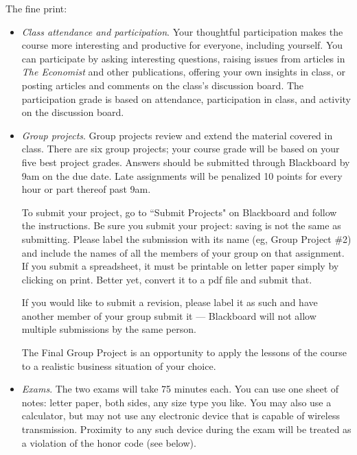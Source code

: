 \documentclass[letterpaper,12pt]{article}
\begin{document}
The fine print:
\begin{itemize}

\item \textit{Class attendance and participation}. Your thoughtful
participation makes the course more interesting and productive for everyone, 
including yourself.  
You can participate by asking interesting questions, 
raising issues from articles in {\it The Economist\/} and 
other publications, 
offering your own insights in class, 
or posting articles and comments on the class's 
discussion board. 
The participation grade is based on attendance, 
participation in class, and activity on the discussion board.  

\item \textit{Group projects}. 
Group projects review and extend the material covered in class.   
There are six group projects; your course grade will be based 
on your five best project grades.  
Answers should be submitted through Blackboard 
by 9am on the due date.
Late assignments will be penalized 10 points for every hour or part
thereof past 9am.  


To submit your project, go to ``Submit Projects" on Blackboard and 
follow the instructions.   
Be sure you submit your project:  saving is not the same as submitting.  
Please label the submission with its name (eg, Group Project \#2) 
and include the names of all the members of your group on that assignment. If you submit a spreadsheet, it must be printable on letter paper simply by clicking on print.  Better yet, convert it to a pdf file and submit that. 

If you would like to submit a revision, 
please label it as such and have another member of your group submit it --- Blackboard will not allow 
multiple submissions by the same person.  

The Final Group Project is an opportunity to 
apply the lessons of the course to a realistic 
business situation of your choice.  

\item \textit{Exams}. The two exams will take 75 minutes each. 
You can use one sheet of notes: letter paper, both sides, any size type you like. You may also use a calculator, but may not use any electronic device
that is capable of wireless transmission.  Proximity to any such
device during the exam will be treated as a violation of the honor
code (see below).  

\end{itemize}
\end{document}
